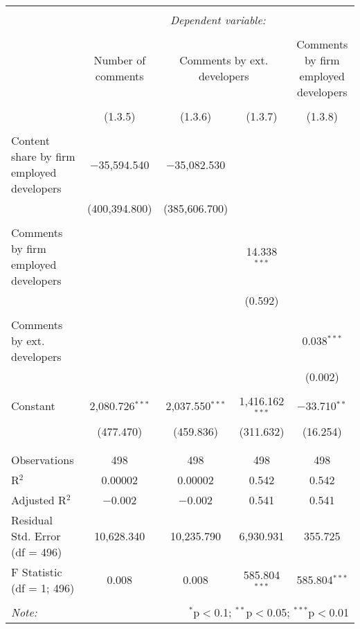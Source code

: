 
\begin{tabular}{@{\extracolsep{5pt}}lcccc}
\\[-1.8ex]\hline
\hline \\[-1.8ex]
 & \multicolumn{4}{c}{\textit{Dependent variable:}} \\
\cline{2-5}
\\[-1.8ex] & Number of comments & \multicolumn{2}{c}{Comments by ext. developers} & Comments by firm employed developers \\
\\[-1.8ex] & (1.3.5) & (1.3.6) & (1.3.7) & (1.3.8)\\
\hline \\[-1.8ex]
 Content share by firm employed developers & $-$35,594.540 & $-$35,082.530 &  &  \\
  & (400,394.800) & (385,606.700) &  &  \\
  & & & & \\
 Comments by firm employed developers &  &  & 14.338$^{***}$ &  \\
  &  &  & (0.592) &  \\
  & & & & \\
 Comments by ext. developers &  &  &  & 0.038$^{***}$ \\
  &  &  &  & (0.002) \\
  & & & & \\
 Constant & 2,080.726$^{***}$ & 2,037.550$^{***}$ & 1,416.162$^{***}$ & $-$33.710$^{**}$ \\
  & (477.470) & (459.836) & (311.632) & (16.254) \\
  & & & & \\
\hline \\[-1.8ex]
Observations & 498 & 498 & 498 & 498 \\
R$^{2}$ & 0.00002 & 0.00002 & 0.542 & 0.542 \\
Adjusted R$^{2}$ & $-$0.002 & $-$0.002 & 0.541 & 0.541 \\
Residual Std. Error (df = 496) & 10,628.340 & 10,235.790 & 6,930.931 & 355.725 \\
F Statistic (df = 1; 496) & 0.008 & 0.008 & 585.804$^{***}$ & 585.804$^{***}$ \\
\hline
\hline \\[-1.8ex]
\textit{Note:}  & \multicolumn{4}{r}{$^{*}$p$<$0.1; $^{**}$p$<$0.05; $^{***}$p$<$0.01} \\
\end{tabular}
